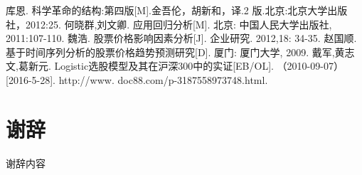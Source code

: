 \documentclass[UTF8,10.5pt,a4paper]{ctexart}
\numberwithin{equation}{section}
\theoremstyle{definition}
\theoremstyle{definition}
\begin{document}
\begin{thebibliography}{MM}
\begin{small}
  库恩. 科学革命的结构:第四版[M].金吾伦，胡新和，译.2 版.北京:北京大学出版社，2012:25.
何晓群,刘文卿. 应用回归分析[M]. 北京: 中国人民大学出版社,   2011:107-110.
魏浩.  股票价格影响因素分析[J].  企业研究. 2012,18: 34-35.
赵国顺.  基于时间序列分析的股票价格趋势预测研究[D]. 厦门: 厦门大学, 2009.
 戴军,黄志文,葛新元.  Logistic选股模型及其在沪深300中的实证[EB/OL]. （2010-09-07）[2016-5-28].  http://www. doc88.com/p-3187558973748.html.



\end{small}
\end{thebibliography}
\newpage
\section*{谢\quad 辞}
谢辞内容
\end{document}
